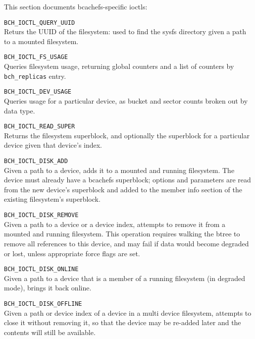 \documentclass{article}
\begin{document}
This section documents bcachefs-specific ioctls:

\begin{description}
	\item \texttt{BCH\_IOCTL\_QUERY\_UUID} \\
		Returs the UUID of the filesystem: used to find the sysfs
		directory given a path to a mounted filesystem.

	\item \texttt{BCH\_IOCTL\_FS\_USAGE} \\
		Queries filesystem usage, returning global counters and a list
		of counters by \texttt{bch\_replicas} entry.

	\item \texttt{BCH\_IOCTL\_DEV\_USAGE} \\
		Queries usage for a particular device, as bucket and sector
		counts broken out by data type.

	\item \texttt{BCH\_IOCTL\_READ\_SUPER} \\
		Returns the filesystem superblock, and optionally the superblock
		for a particular device given that device's index.

	\item \texttt{BCH\_IOCTL\_DISK\_ADD} \\
		Given a path to a device, adds it to a mounted and running
		filesystem. The device must already have a bcachefs superblock;
		options and parameters are read from the new device's superblock
		and added to the member info section of the existing
		filesystem's superblock.

	\item \texttt{BCH\_IOCTL\_DISK\_REMOVE} \\
		Given a path to a device or a device index, attempts to remove
		it from a mounted and running filesystem. This operation
		requires walking the btree to remove all references to this
		device, and may fail if data would become degraded or lost,
		unless appropriate force flags are set.

	\item \texttt{BCH\_IOCTL\_DISK\_ONLINE} \\
		Given a path to a device that is a member of a running
		filesystem (in degraded mode), brings it back online.

	\item \texttt{BCH\_IOCTL\_DISK\_OFFLINE} \\
		Given a path or device index of a device in a multi device
		filesystem, attempts to close it without removing it, so that
		the device may be re-added later and the contents will still be
		available.


\end{description}
\end{document}
